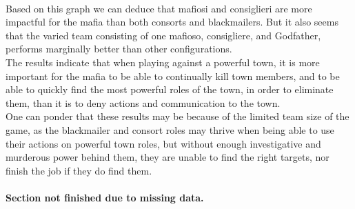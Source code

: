 \\Based on this graph we can deduce that mafiosi and consiglieri are more 
impactful for the mafia than both consorts and blackmailers. But it also seems 
that the varied team consisting of one mafioso, consigliere, and Godfather, 
performs marginally better than other configurations. \\
The results indicate that when playing against a powerful town, it is more 
important for the mafia to be able to continually kill town members, and to be 
able to quickly find the most powerful roles of the town, in order to eliminate 
them, than it is to deny actions and communication to the town. \\
One can ponder that these results may be because of the limited team size of 
the game, as the blackmailer and consort roles may thrive when being able to 
use 
their actions on powerful town roles, but without enough investigative and 
murderous power behind them, they are unable to find the right targets, nor 
finish the job if they do find them. \\\\
\textbf{Section not finished due to missing data.}
